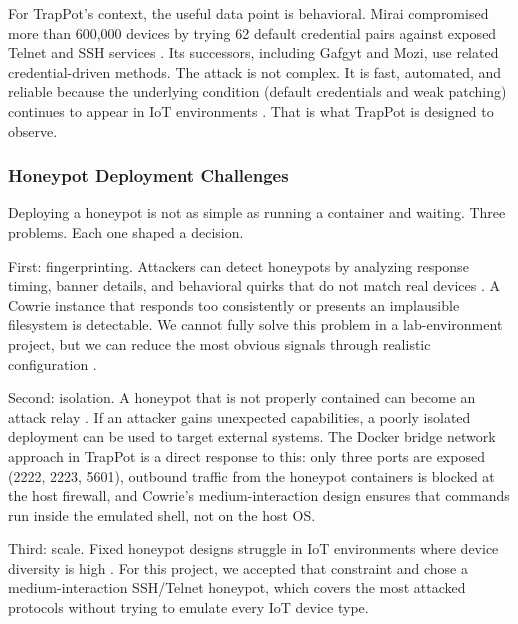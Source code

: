 For TrapPot's context, the useful data point is behavioral. Mirai compromised more than 600,000 devices by trying 62 default credential pairs against exposed Telnet and SSH services \cite{203628}. Its successors, including Gafgyt and Mozi, use related credential-driven methods. The attack is not complex. It is fast, automated, and reliable because the underlying condition (default credentials and weak patching) continues to appear in IoT environments \cite{suareztangil2023stories}. That is what TrapPot is designed to observe.

\subsubsection{Honeypot Deployment Challenges}
\label{subsub:honeypot_challenges}

Deploying a honeypot is not as simple as running a container and waiting. Three problems. Each one shaped a decision.

First: fingerprinting. Attackers can detect honeypots by analyzing response timing, banner details, and behavioral quirks that do not match real devices \cite{franco2021survey}. A Cowrie instance that responds too consistently or presents an implausible filesystem is detectable. We cannot fully solve this problem in a lab-environment project, but we can reduce the most obvious signals through realistic configuration \cite{morozov2024sweet}.

Second: isolation. A honeypot that is not properly contained can become an attack relay \cite{commey2025blockchain}. If an attacker gains unexpected capabilities, a poorly isolated deployment can be used to target external systems. The Docker bridge network approach in TrapPot is a direct response to this: only three ports are exposed (2222, 2223, 5601), outbound traffic from the honeypot containers is blocked at the host firewall, and Cowrie's medium-interaction design ensures that commands run inside the emulated shell, not on the host OS.

Third: scale. Fixed honeypot designs struggle in IoT environments where device diversity is high \cite{morozov2024sweet}. For this project, we accepted that constraint and chose a medium-interaction SSH/Telnet honeypot, which covers the most attacked protocols without trying to emulate every IoT device type.

